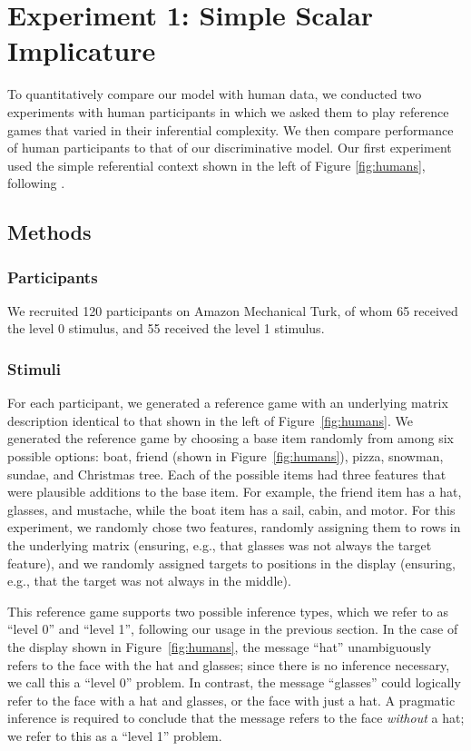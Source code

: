 \section{Experiment 1: Simple Scalar Implicature}

To quantitatively compare our model with human data, we conducted two
experiments with human participants in which we asked them to play
reference games that varied in their inferential complexity. We then
compare performance of human participants to that of our
discriminative model. Our first experiment used the simple referential
context shown in the left of Figure \ref{fig:humans}, following
\cite{Stiller:Goodman:Frank:2011}.

\subsection{Methods}

\subsubsection{Participants}

We recruited 120 participants on Amazon Mechanical Turk, of whom 65
received the level 0 stimulus, and 55 received the level 1 stimulus.

\subsubsection{Stimuli}

For each participant, we generated a reference game with an underlying
matrix description identical to that shown in the left of
Figure~\ref{fig:humans}. We generated the reference game by choosing a
base item randomly from among six possible options: boat, friend
(shown in Figure~\ref{fig:humans}), pizza, snowman, sundae, and
Christmas tree. Each of the possible items had three features that
were plausible additions to the base item. For example, the friend
item has a hat, glasses, and mustache, while the boat item has a sail,
cabin, and motor. For this experiment, we randomly chose two features,
randomly assigning them to rows in the underlying matrix (ensuring,
e.g., that glasses was not always the target feature), and we randomly
assigned targets to positions in the display (ensuring, e.g., that the
target was not always in the middle).

This reference game supports two possible inference types, which we
refer to as ``level 0'' and ``level 1'', following our usage in the
previous section.  In the case of the display shown in
Figure~\ref{fig:humans}, the message ``hat'' unambiguously refers to
the face with the hat and glasses; since there is no inference
necessary, we call this a ``level 0'' problem. In contrast, the
message ``glasses'' could logically refer to the face with a hat and
glasses, or the face with just a hat. A pragmatic inference is
required to conclude that the message refers to the face
\emph{without} a hat; we refer to this as a ``level 1'' problem.


